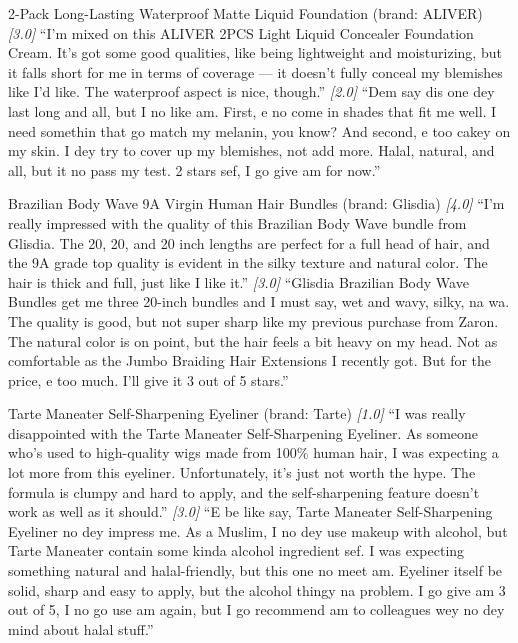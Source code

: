\documentclass[8pt,twocolumn,a4paper]{extarticle}
\begin{document}
{2-Pack Long-Lasting Waterproof Matte Liquid Foundation (brand: ALIVER)}
{\textit{[3.0]} ``I'm mixed on this ALIVER 2PCS Light Liquid Concealer Foundation Cream. It's got some good qualities, like being lightweight and moisturizing, but it falls short for me in terms of coverage --- it doesn't fully conceal my blemishes like I'd like. The waterproof aspect is nice, though.''}
{\textit{[2.0]} ``Dem say dis one dey last long and all, but I no like am. First, e no come in shades that fit me well. I need somethin that go match my melanin, you know? And second, e too cakey on my skin. I dey try to cover up my blemishes, not add more. Halal, natural, and all, but it no pass my test. 2 stars sef, I go give am for now.''}

{Brazilian Body Wave 9A Virgin Human Hair Bundles (brand: Glisdia)}
{\textit{[4.0]} ``I'm really impressed with the quality of this Brazilian Body Wave bundle from Glisdia. The 20, 20, and 20 inch lengths are perfect for a full head of hair, and the 9A grade top quality is evident in the silky texture and natural color. The hair is thick and full, just like I like it.''}
{\textit{[3.0]} ``Glisdia Brazilian Body Wave Bundles get me three 20-inch bundles and I must say, wet and wavy, silky, na wa. The quality is good, but not super sharp like my previous purchase from Zaron. The natural color is on point, but the hair feels a bit heavy on my head. Not as comfortable as the Jumbo Braiding Hair Extensions I recently got. But for the price, e too much. I'll give it 3 out of 5 stars.''}

{Tarte Maneater Self-Sharpening Eyeliner (brand: Tarte)}
{\textit{[1.0]} ``I was really disappointed with the Tarte Maneater Self-Sharpening Eyeliner. As someone who's used to high-quality wigs made from 100\% human hair, I was expecting a lot more from this eyeliner. Unfortunately, it's just not worth the hype. The formula is clumpy and hard to apply, and the self-sharpening feature doesn't work as well as it should.''}
{\textit{[3.0]} ``E be like say, Tarte Maneater Self-Sharpening Eyeliner no dey impress me. As a Muslim, I no dey use makeup with alcohol, but Tarte Maneater contain some kinda alcohol ingredient sef. I was expecting something natural and halal-friendly, but this one no meet am. Eyeliner itself be solid, sharp and easy to apply, but the alcohol thingy na problem. I go give am 3 out of 5, I no go use am again, but I go recommend am to colleagues wey no dey mind about halal stuff.''}
\end{document}
